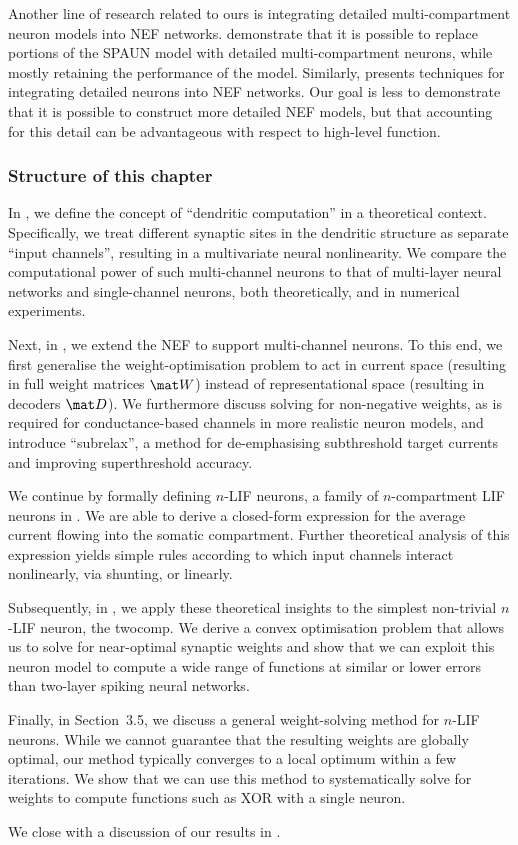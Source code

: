 Another line of research related to ours is integrating detailed multi-compartment neuron models into NEF networks.
 demonstrate that it is possible to replace portions of the SPAUN model \citep{eliasmith2012largescale} with detailed multi-compartment neurons, while mostly retaining the performance of the model. Similarly, \citet{duggins2017incorporating} presents techniques for integrating detailed neurons into NEF networks.
Our goal is less to demonstrate that it is possible to construct more detailed NEF models, but that accounting for this detail can be advantageous with respect to high-level function.

\subsubsection{Structure of this chapter}
In , we define the concept of \enquote{dendritic computation} in a theoretical context.
Specifically, we treat different synaptic sites in the dendritic structure as separate \enquote{input channels}, resulting in a multivariate neural nonlinearity.
We compare the computational power of such multi-channel neurons to that of multi-layer neural networks and single-channel neurons, both theoretically, and in numerical experiments.

Next, in , we extend the NEF to support multi-channel neurons.
To this end, we first generalise the weight-optimisation problem to act in current space (resulting in full weight matrices $\mat W$) instead of representational space (resulting in decoders $\mat D$).
We furthermore discuss solving for non-negative weights, as is required for conductance-based channels in more realistic neuron models, and introduce \enquote{\gls{subrelax}}, a method for de-emphasising subthreshold target currents and improving superthreshold accuracy.

We continue by formally defining $n$-LIF neurons, a family of $n$-compartment LIF neurons in .
We are able to derive a closed-form expression for the average current flowing into the somatic compartment.
Further theoretical analysis of this expression yields simple rules according to which input channels interact nonlinearly, via shunting, or linearly.

Subsequently, in , we apply these theoretical insights to the simplest non-trivial $n$-LIF neuron, the \gls{twocomp}.
We derive a convex optimisation problem that allows us to solve for near-optimal synaptic weights and show that we can exploit this neuron model to compute a wide range of functions at similar or lower errors than two-layer spiking neural networks.

Finally, in Section~3.5, we discuss a general weight-solving method for $n$-LIF neurons.
While we cannot guarantee that the resulting weights are globally optimal, our method typically converges to a local optimum within a few iterations.
We show that we can use this method to systematically solve for weights to compute functions such as XOR with a single neuron.

We close with a discussion of our results in .
